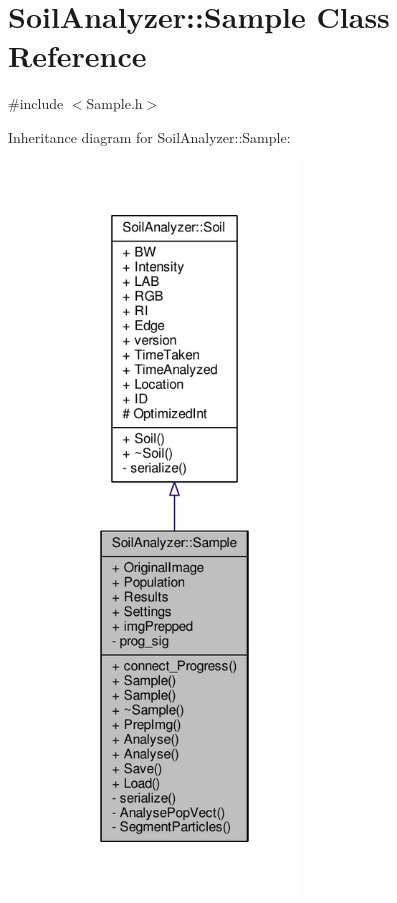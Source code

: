 \hypertarget{class_soil_analyzer_1_1_sample}{}\section{Soil\+Analyzer\+:\+:Sample Class Reference}
\label{class_soil_analyzer_1_1_sample}


{\ttfamily \#include $<$Sample.\+h$>$}



Inheritance diagram for Soil\+Analyzer\+:\+:Sample\+:\nopagebreak
\begin{figure}[H]
\begin{center}
\leavevmode
\includegraphics[height=550pt]{class_soil_analyzer_1_1_sample__inherit__graph}
\end{center}
\end{figure}


